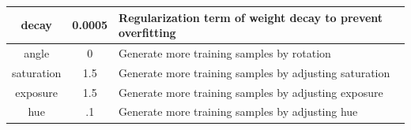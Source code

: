 \begin{table}[t]
{\begin{tabular}{@{}ccl@{}}
\multicolumn{1}{|c|}{decay}          & \multicolumn{1}{c|}{0.0005}                                                                          & \multicolumn{1}{l|}{Regularization term of weight decay  to prevent overfitting}                                                                                                                                                                                                                                                                                                                       \\ \midrule
\multicolumn{1}{|c|}{angle}          & \multicolumn{1}{c|}{0}                                                                               & \multicolumn{1}{l|}{Generate more training samples by rotation}                                                                                                                                                                                                                                                                                                                                        \\ \midrule
\multicolumn{1}{|c|}{saturation}     & \multicolumn{1}{c|}{1.5}                                                                             & \multicolumn{1}{l|}{Generate more training samples by adjusting saturation}                                                                                                                                                                                                                                                                                                                            \\ \midrule
\multicolumn{1}{|c|}{exposure}       & \multicolumn{1}{c|}{1.5}                                                                             & \multicolumn{1}{l|}{Generate more training samples by adjusting exposure}                                                                                                                                                                                                                                                                                                                              \\ \midrule
\multicolumn{1}{|c|}{hue}            & \multicolumn{1}{c|}{.1}                                                                              & \multicolumn{1}{l|}{Generate more training samples by adjusting hue}                                                                                                                                                                                                                                                                                                                                   \\ \midrule

\end{tabular}}
\end{table}
